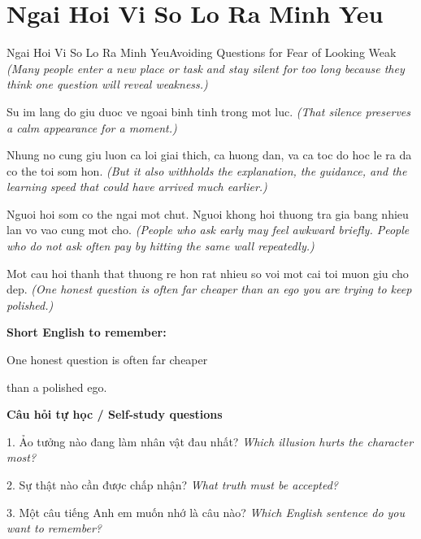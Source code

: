 \section{Ngai Hoi Vi So Lo Ra Minh Yeu}
\begin{truyen}{Ngai Hoi Vi So Lo Ra Minh Yeu}{Avoiding Questions for Fear of Looking Weak}
\textit{(Many people enter a new place or task and stay silent for too long because they think one question will reveal weakness.)}

Su im lang do giu duoc ve ngoai binh tinh trong mot luc.
\textit{(That silence preserves a calm appearance for a moment.)}

Nhung no cung giu luon ca loi giai thich, ca huong dan, va ca toc do hoc le ra da co the toi som hon.
\textit{(But it also withholds the explanation, the guidance, and the learning speed that could have arrived much earlier.)}

Nguoi hoi som co the ngai mot chut. Nguoi khong hoi thuong tra gia bang nhieu lan vo vao cung mot cho.
\textit{(People who ask early may feel awkward briefly. People who do not ask often pay by hitting the same wall repeatedly.)}

\end{truyen}

\begin{baihoc}
Mot cau hoi thanh that thuong re hon rat nhieu so voi mot cai toi muon giu cho dep.
\textit{(One honest question is often far cheaper than an ego you are trying to keep polished.)}
\end{baihoc}

\begin{ghinhoanh}
\textbf{Short English to remember:}

One honest question is often far cheaper

than a polished ego.

\end{ghinhoanh}

\begin{tuhocnhanh}
\textbf{Câu hỏi tự học / Self-study questions}

1. Ảo tưởng nào đang làm nhân vật đau nhất? \textit{Which illusion hurts the character most?}

2. Sự thật nào cần được chấp nhận? \textit{What truth must be accepted?}

3. Một câu tiếng Anh em muốn nhớ là câu nào? \textit{Which English sentence do you want to remember?}
\end{tuhocnhanh}
\ngancach

